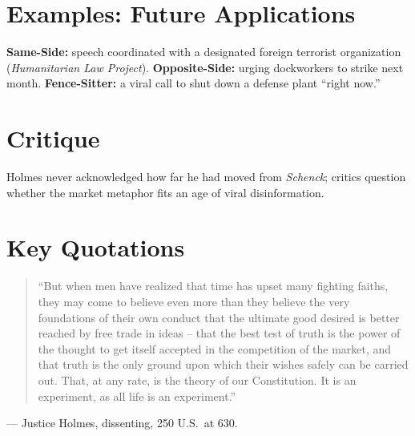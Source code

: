\documentclass[12pt]{article}
\begin{document}
\section{Examples: Future Applications}
\textbf{Same-Side:} speech coordinated with a designated foreign terrorist organization (\textit{Humanitarian Law Project}). \textbf{Opposite-Side:} urging dockworkers to strike next month. \textbf{Fence-Sitter:} a viral call to shut down a defense plant ``right now.''

\section{Critique}
Holmes never acknowledged how far he had moved from \textit{Schenck}; critics question whether the market metaphor fits an age of viral disinformation.

\section{Key Quotations}
\begin{quote}
``But when men have realized that time has upset many fighting faiths, they may come to believe even more than they believe the very foundations of their own conduct that the ultimate good desired is better reached by free trade in ideas -- that the best test of truth is the power of the thought to get itself accepted in the competition of the market, and that truth is the only ground upon which their wishes safely can be carried out. That, at any rate, is the theory of our Constitution. It is an experiment, as all life is an experiment.''
\end{quote}
\noindent --- Justice Holmes, dissenting, 250 U.S.\ at 630.
\end{document}
